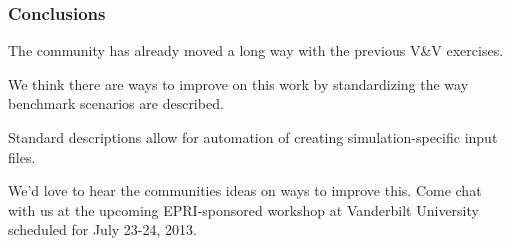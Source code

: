 
\begin{frame}
  \frametitle{Conclusions}
  The community has already moved a long way with the previous V\&V exercises.

  We think there are ways to improve on this work by standardizing the way
  benchmark scenarios are described.

  Standard descriptions allow for automation of creating simulation-specific
  input files.

  We'd love to hear the communities ideas on ways to improve this. Come chat
  with us at the upcoming EPRI-sponsored workshop at Vanderbilt University
  scheduled for July 23-24, 2013.
\end{frame}
